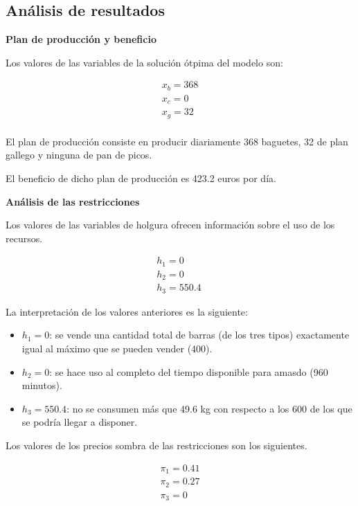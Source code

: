 \subsection{Análisis de resultados}

\textbf{Plan de producción y beneficio}

Los valores de las variables de la solución ótpima del modelo son:

\begin{equation}
\begin{split}
    x_b = 368\\
    x_c = 0\\
    x_g = 32\\
\end{split}    
\end{equation}

El plan de producción consiste en producir diariamente 368 baguetes, 32 de plan gallego y ninguna de pan de picos.

El beneficio de dicho plan de producción es 423.2 euros por día.

\textbf{Análisis de las restricciones}

Los valores de las variables de holgura ofrecen información sobre el uso de los recursos.

\begin{equation}
\begin{split}
    h_1 = 0\\
    h_2 = 0\\
    h_3 = 550.4\
\end{split}    
\end{equation}

La interpretación de los valores anteriores es la siguiente:
\begin{itemize}
    \item $h_1 = 0$: se vende una cantidad total de barras (de los tres tipos) exactamente igual al máximo que se pueden vender (400).
    \item $h_2 = 0$: se hace uso al completo del tiempo disponible para amasdo (960 minutos).
    \item $h_3 = 550.4$: no se consumen más que 49.6 kg con respecto a los 600 de los que se podría llegar a disponer.
\end{itemize}

Los valores de los precios sombra de las restricciones son los siguientes.

\begin{equation}
\begin{split}
    \pi_1 = 0.41\\
    \pi_2 = 0.27\\
    \pi_3 = 0\\
\end{split}    
\end{equation}

